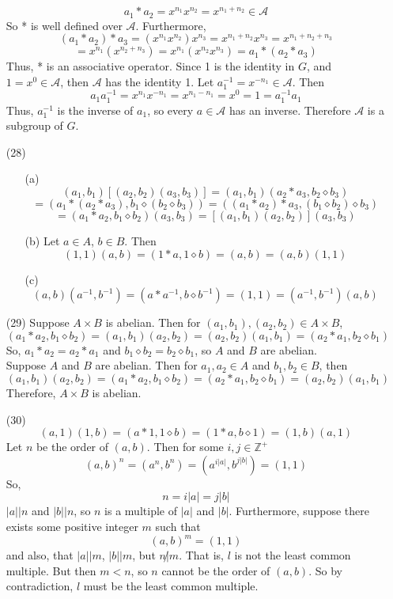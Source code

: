 \documentclass[12pt]{article}
\begin{document}
\begin{itemize}
$$a_1 * a_2 = x^{n_1}x^{n_2} = x^{n_1 + n_2} \in \mathcal{A}$$
So * is well defined over $\mathcal{A}$. Furthermore,
$$(a_1 * a_2) * a_3 = (x^{n_1}x^{n_2})x^{n_3} = x^{n_1 + n_2}x^{n_3} = x^{n_1 + n_2 + n_3}$$ 
$$= x^{n_1}(x^{n_2 + n_3}) = x^{n_1}(x^{n_2}x^{n_3}) = a_1 * (a_2 * a_3)$$
Thus, * is an associative operator. Since 1 is the identity in $G$, and $1 = x^0 \in \mathcal{A}$, then $\mathcal{A}$ has the identity 1. Let $a_1^{-1} = x^{-n_1} \in \mathcal{A}$. Then
$$a_1a_1^{-1} = x^{n_1}x^{-n_1} = x^{n_1 - n_1} = x^0 = 1 = a_1^{-1}a_1$$
Thus, $a_1^{-1}$ is the inverse of $a_1$, so every $a \in \mathcal{A}$ has an inverse. Therefore $\mathcal{A}$ is a subgroup of $G$.
\item[(28)]
\begin{itemize}
\item[(a)]
$$(a_1, b_1)[(a_2, b_2)(a_3, b_3)] = (a_1, b_1)(a_2 * a_3, b_2 \diamond b_3)$$
$$= (a_1 * (a_2 * a_3), b_1 \diamond (b_2 \diamond b_3)) = ((a_1 * a_2) * a_3, (b_1 \diamond b_2) \diamond b_3)$$
$$= (a_1 * a_2, b_1 \diamond b_2)(a_3, b_3) = [(a_1, b_1)(a_2, b_2)](a_3, b_3)$$
\item[(b)] Let $a \in A$, $b \in B$. Then
$$(1, 1)(a, b) = (1 * a, 1 \diamond b) = (a, b) = (a, b)(1, 1)$$
\item[(c)]
$$(a, b)(a^{-1}, b^{-1}) = (a * a^{-1}, b \diamond b^{-1}) = (1, 1) = (a^{-1}, b^{-1})(a, b)$$
\end{itemize}
\item[(29)]
Suppose $A \times B$ is abelian. Then for $(a_1, b_1), (a_2, b_2) \in A \times B$,
$$(a_1 * a_2, b_1 \diamond b_2) = (a_1, b_1)(a_2, b_2) =  (a_2, b_2)(a_1, b_1) = (a_2 * a_1, b_2 \diamond b_1)$$
So, $a_1 * a_2 = a_2 * a_1$ and $b_1 \diamond b_2 = b_2 \diamond b_1$, so $A$ and $B$ are abelian. \\
Suppose $A$ and $B$ are abelian. Then for $a_1, a_2 \in A$ and $b_1, b_2 \in B$, then
$$(a_1, b_1)(a_2, b_2) = (a_1 * a_2, b_1 \diamond b_2) = (a_2 * a_1, b_2 \diamond b_1) =  (a_2, b_2)(a_1, b_1)$$
Therefore, $A \times B$ is abelian.
\item[(30)]
$$(a, 1)(1, b) = (a * 1, 1 \diamond b) = (1 * a, b \diamond 1) = (1, b)(a, 1)$$
Let $n$ be the order of $(a, b)$. Then for some $i, j \in \mathbb{Z}^+$
$$(a, b)^n = (a^n, b^n) = (a^{i|a|}, b^{j|b|}) = (1, 1)$$
So,
$$n = i|a| = j|b|$$
$|a| | n$ and $|b| | n$, so $n$ is a multiple of $|a|$ and $|b|$. Furthermore, suppose there exists some positive integer $m$ such that
$$(a, b)^m = (1, 1)$$
and also, that $|a| | m$, $|b| | m$, but $n \not | m$. That is, $l$ is not the least common multiple. But then $m < n$, so $n$ cannot be the order of $(a, b)$. So by contradiction, $l$ must be the least common multiple.

\end{itemize}
\end{document}
